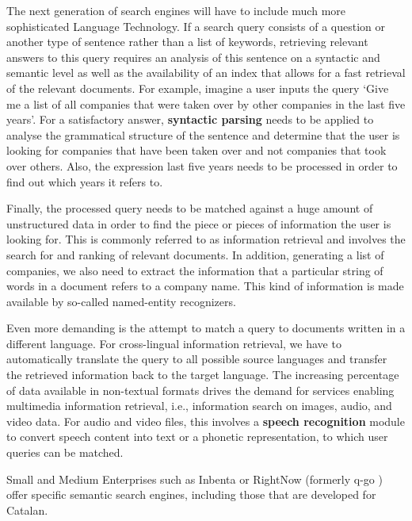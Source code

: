 \begin{multicols}{2}

The next generation of search engines will have to include much more sophisticated Language Technology. If a search query consists of a question or another type of sentence rather than a list of keywords, retrieving relevant answers to this query requires an analysis of this sentence on a syntactic and semantic level as well as the availability of an index that allows for a fast retrieval of the relevant documents. For example, imagine a user inputs the query ‘Give me a list of all companies that were taken over by other companies in the last five years’. For a satisfactory answer, \textbf{syntactic parsing} needs to be applied to analyse the grammatical structure of the sentence and determine that the user is looking for companies that have been taken over and not companies that took over others. Also, the expression last five years needs to be processed in order to find out which years it refers to. 

Finally, the processed query needs to be matched against a huge amount of unstructured data in order to find the piece or pieces of information the user is looking for. This is commonly referred to as information retrieval and involves the search for and ranking of relevant documents. In addition, generating a list of companies, we also need to extract the information that a particular string of words in a document refers to a company name. This kind of information is made available by so-called named-entity recognizers. 

Even more demanding is the attempt to match a query to documents written in a different language. For cross-lingual information retrieval, we have to automatically translate the query to all possible source languages and transfer the retrieved information back to the target language. The increasing percentage of data available in non-textual formats drives the demand for services enabling multimedia information retrieval, i.e., information search on images, audio, and video data. For audio and video files, this involves a \textbf{speech recognition} module to convert speech content into text or a phonetic representation, to which user queries can be matched.

Small and Medium Enterprises such as Inbenta \cite{CAT-inbenta} or RightNow (formerly q-go \cite{CAT-rightnow}) offer specific semantic search engines, including those that are developed for Catalan.


\end{multicols}

